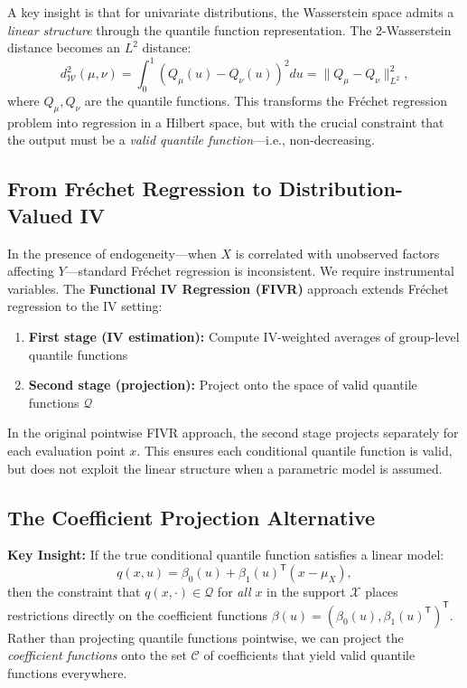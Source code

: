\documentclass[12pt]{article}
\newcommand{\T}{\mathsf{T}}
\newcommand{\calQ}{\mathcal{Q}}
\begin{document}
A key insight is that for univariate distributions, the Wasserstein space admits a \emph{linear structure} through the quantile function representation. The 2-Wasserstein distance becomes an $L^2$ distance:
\[
d_{\mathcal{W}}^2(\mu, \nu) = \int_0^1 \left( Q_\mu(u) - Q_\nu(u) \right)^2 du = \|Q_\mu - Q_\nu\|_{L^2}^2,
\]
where $Q_\mu, Q_\nu$ are the quantile functions. This transforms the Fréchet regression problem into regression in a Hilbert space, but with the crucial constraint that the output must be a \emph{valid quantile function}---i.e., non-decreasing.

\subsection{From Fréchet Regression to Distribution-Valued IV}

In the presence of endogeneity---when $X$ is correlated with unobserved factors affecting $Y$---standard Fréchet regression is inconsistent. We require instrumental variables. The \textbf{Functional IV Regression (FIVR)} approach extends Fréchet regression to the IV setting:
\begin{enumerate}
\item \textbf{First stage (IV estimation):} Compute IV-weighted averages of group-level quantile functions
\item \textbf{Second stage (projection):} Project onto the space of valid quantile functions $\calQ$
\end{enumerate}

In the original pointwise FIVR approach, the second stage projects separately for each evaluation point $x$. This ensures each conditional quantile function is valid, but does not exploit the linear structure when a parametric model is assumed.

\subsection{The Coefficient Projection Alternative}

\textbf{Key Insight:} If the true conditional quantile function satisfies a linear model:
\[
q(x,u) = \beta_0(u) + \beta_1(u)^\T (x - \mu_X),
\]
then the constraint that $q(x,\cdot) \in \calQ$ for \emph{all} $x$ in the support $\mathcal{X}$ places restrictions directly on the coefficient functions $\beta(u) = (\beta_0(u), \beta_1(u)^\T)^\T$. Rather than projecting quantile functions pointwise, we can project the \emph{coefficient functions} onto the set $\mathcal{C}$ of coefficients that yield valid quantile functions everywhere.
\end{document}
